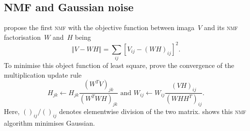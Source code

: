 \subsection{NMF and Gaussian noise}
\citet{lee2001algorithms} propose the first \textsc{nmf} with the objective function between imaga~$V$ and its \textsc{nmf} factorisation~$W$ and~$H$ being
\begin{equation*}
  \left\Vert V-WH \right\Vert= \sum_{ij} \left[V_{ij}-(WH)_{ij}\right]^2.
\end{equation*}
To minimise this object function of least square, \citet{lee2001algorithms} prove the convergence of the multiplication update rule
\begin{equation*}
H_{jk}\leftarrow H_{jk}\frac{(W^{T}V)_{jk}}{(W^{T}WH)_{jk}} \text{ and } W_{ij}\leftarrow W_{ij}\frac{(VH)_{ij}}{(WHH^{T})_{ij}}.
\end{equation*}
Here, $()_{ij}/()_{ij}$ denotes elementwise division of the two matrix. \citet{liu2015performance} shows this \textsc{nmf} algorithm minimises Gaussian.


